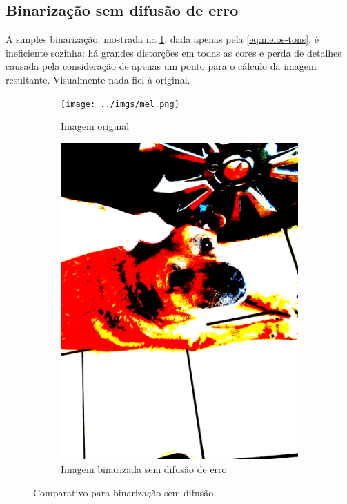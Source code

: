 \documentclass[brazilian,a4paper,twocolumn]{article}
\begin{document}
    \subsection{Binarização sem difusão de erro}

        A simples binarização, mostrada na \cref{fig:binarizada-sem_difusao}, dada apenas pela \cref{eq:meios-tons}, é ineficiente sozinha: há grandes distorções em todas as cores e perda de detalhes causada pela consideração de apenas um ponto para o cálculo da imagem resultante. Visualmente nada fiel à original.

        \begin{figure}
            \centering
            \begin{subfigure}{0.24\textwidth}
                \texttt{[image: ../imgs/mel.png]}
                \caption{Imagem original}
            \end{subfigure}
            \begin{subfigure}{0.24\textwidth}
                \includegraphics[width=\textwidth,keepaspectratio]{../imgs/mel-binarizada.png}
                \caption{Imagem binarizada sem difusão de erro}
            \end{subfigure}

            \caption{Comparativo para binarização sem difusão}
            \label{fig:binarizada-sem_difusao}
        \end{figure}
\end{document}
